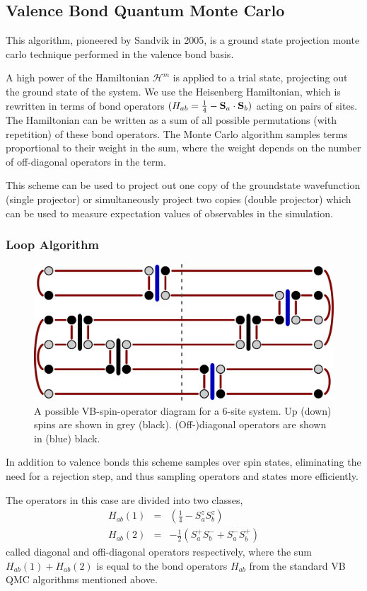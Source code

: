 \documentclass[prb,aps,twocolumn,floatfix,amsmath,amssymb,superscriptaddress,tightenlines]{revtex4}
\begin{document}
\subsection{Valence Bond Quantum Monte Carlo}

This algorithm, pioneered by Sandvik \cite{papers} in 2005, is a ground state projection monte carlo technique performed in the valence bond basis.

A high power of the Hamiltonian $\mathcal{H}^m$ 
is applied to a trial state, projecting out the ground state of the system.
We use the Heisenberg Hamiltonian, which is rewritten in terms of bond operators $(H_{ab} = \tfrac{1}{4} - {\bf S}_a \cdot {\bf S}_b)$ acting on pairs of sites.
The Hamiltonian can be written as a sum of all possible {permutations (with repetition)} of these bond operators.
The Monte Carlo algorithm samples terms proportional to their weight in the sum, where the weight depends on the number of off-diagonal operators in the term.

This scheme can be used to project out one copy of the groundstate wavefunction (single projector) or simultaneously project two copies (double projector) which can be used to measure expectation values of observables in the simulation. 

\subsubsection{Loop Algorithm}

\begin{figure} {
\includegraphics[width=3.2 in]{loopalg.pdf} \caption{ A possible VB-spin-operator diagram for a 6-site system.
Up (down) spins are shown in grey (black). (Off-)diagonal operators are shown in (blue) black.
\label{loop1} }
} \end{figure}

In addition to valence bonds this scheme samples over spin states, eliminating the need for a rejection step, and thus sampling operators and states more efficiently.

The operators in this case are divided into two classes,
\begin{eqnarray}
	H_{ab}(1) &=&(\tfrac{1}{4} - S^z_aS^z_b) \\
	H_{ab}(2) &=& %
		         -\tfrac{1}{2}(S_a^+S_b^- + S_a^-S_b^+)
\end{eqnarray}
called diagonal and offi-diagonal operators respectively, where the sum $H_{ab}(1) + H_{ab}(2)$ is equal to the bond operators $H_{ab}$ from the standard VB QMC algorithms mentioned above.
\end{document}
